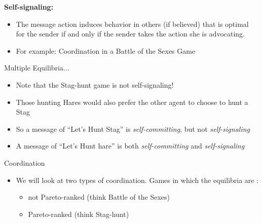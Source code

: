\documentclass{beamer}
\begin{document}
\begin{frame}
\textbf{Self-signaling:}
		\begin{itemize}
			\item The message action induces behavior in others (if believed) that is optimal for the sender if and only if the sender takes the action she is advocating.
			\item For example: Coordination in a Battle of the Sexes Game
		\end{itemize}
\end{frame}

\begin{frame}{Multiple Equilibria...}
	\begin{itemize}
		\item Note that the Stag-hunt game is not self-signaling!
		\item Those hunting Hares would also prefer the other agent to choose to hunt a Stag
		\item So a message of ``Let's Hunt Stag'' is \emph{self-committing}, but not \emph{self-signaling}
		\item A message of ``Let's Hunt hare'' is both \emph{self-committing} and \emph{self-signaling}
	\end{itemize}
\end{frame}

\begin{frame}{Coordination}
	\begin{itemize}
		\item We will look at two types of coordination. Games in which the equilibria are :
		\begin{itemize}
			\item not Pareto-ranked (think Battle of the Sexes)
			\item Pareto-ranked (think Stag-hunt)
		\end{itemize}
	\end{itemize}
\end{frame}
\end{document}
